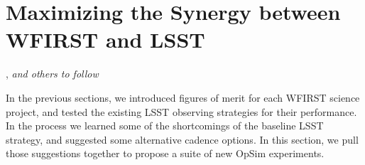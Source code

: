 %
%
%
%
%
%
%

\section{Maximizing the Synergy between WFIRST and LSST}
\def\secname{\chpname:proposals}\label{sec:\secname}

,
{\it and others to follow}

In the previous sections, we introduced figures of merit for each WFIRST
science project, and tested the existing LSST observing strategies for
their performance. In the process we learned some of the shortcomings of the
baseline LSST strategy, and suggested some alternative cadence
options. In this section, we pull those suggestions together to propose a
suite of new OpSim experiments.



\navigationbar
